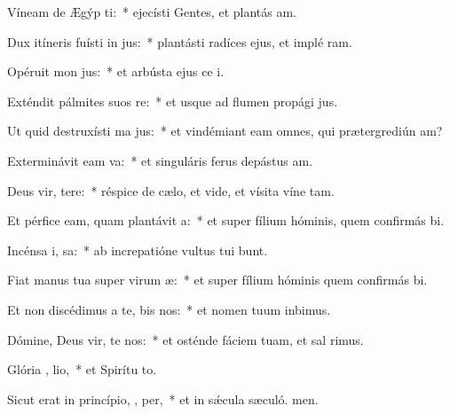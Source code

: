 \item Víneam de Ægýp ti:~* ejecísti Gentes, et plantás am.
\item Dux itíneris fuísti in  jus:~* plantásti radíces ejus, et implé ram.
\item Opéruit mon  jus:~* et arbústa ejus ce i.
\item Exténdit pálmites suos   re:~* et usque ad flumen propági jus.
\item Ut quid destruxísti ma jus:~* et vindémiant eam omnes, qui prætergrediún am?
\item Exterminávit eam   va:~* et singuláris ferus depástus  am.
\item Deus vir, tere:~* réspice de cælo, et vide, et vísita víne tam.
\item Et pérfice eam, quam plantávit  a:~* et super fílium hóminis, quem confirmás bi.
\item Incénsa i,  sa:~* ab increpatióne vultus tui bunt.
\item Fiat manus tua super virum  æ:~* et super fílium hóminis quem confirmás bi.
\item Et non discédimus a te, bis nos:~* et nomen tuum inbimus.
\item Dómine, Deus vir, te nos:~* et osténde fáciem tuam, et sal rimus.
\item Glória ,  lio,~* et Spirítu to.
\item Sicut erat in princípio,  ,  per,~* et in sǽcula sæculó. men.
